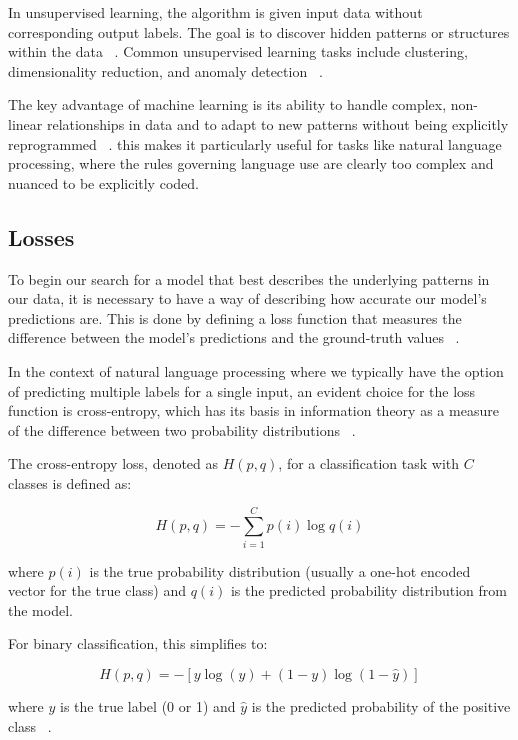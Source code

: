 \documentclass[a4paper, oneside]{discothesis}
\begin{document}
In unsupervised learning, the algorithm is given input data without corresponding output labels. The goal is to discover hidden patterns or structures within the data ~\cite{ghahramani2004unsupervised}. Common unsupervised learning tasks include clustering, dimensionality reduction, and anomaly detection ~\cite{hinton2006reducing}.

The key advantage of machine learning is its ability to handle complex, non-linear relationships in data and to adapt to new patterns without being explicitly reprogrammed ~\cite{goodfellow2016deep}. this makes it particularly useful for tasks like natural language processing, where the rules governing language use are clearly too complex and nuanced to be explicitly coded.

\subsection{Losses}
To begin our search for a model that best describes the underlying patterns in our data, it is necessary to have a way of describing how accurate our model's predictions are. This is done by defining a loss function that measures the difference between the model's predictions and the ground-truth values ~\cite{goodfellow2016deep}.

In the context of natural language processing where we typically have the option of predicting multiple labels for a single input, an evident choice for the loss function is cross-entropy, which has its basis in information theory as a measure of the difference between two probability distributions ~\cite{shannon1948mathematical}.

The cross-entropy loss, denoted as $H(p,q)$, for a classification task with $C$ classes is defined as:

\begin{equation}
    H(p,q) = -\sum_{i=1}^C p(i) \log q(i)
\end{equation}

where $p(i)$ is the true probability distribution (usually a one-hot encoded vector for the true class) and $q(i)$ is the predicted probability distribution from the model.

For binary classification, this simplifies to:

\begin{equation}
    H(p,q) = -[y \log(\hat{y}) + (1-y) \log(1-\hat{y})]
\end{equation}

where $y$ is the true label (0 or 1) and $\hat{y}$ is the predicted probability of the positive class ~\cite{bishop2006pattern}.
\end{document}
